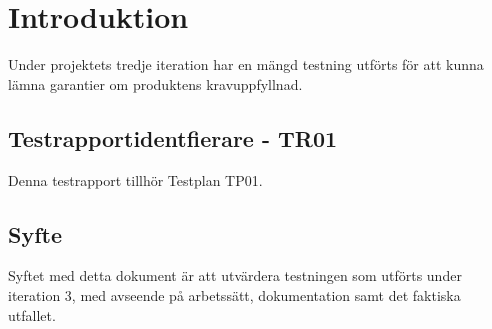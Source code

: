 \section{Introduktion}
Under projektets tredje iteration har en mängd testning utförts för att kunna lämna garantier om produktens kravuppfyllnad. 
\subsection{Testrapportidentfierare - TR01}
Denna testrapport tillhör Testplan TP01.

\subsection{Syfte}
Syftet med detta dokument är att utvärdera testningen som utförts under iteration 3, med avseende på arbetssätt, dokumentation samt det faktiska utfallet. 
 

